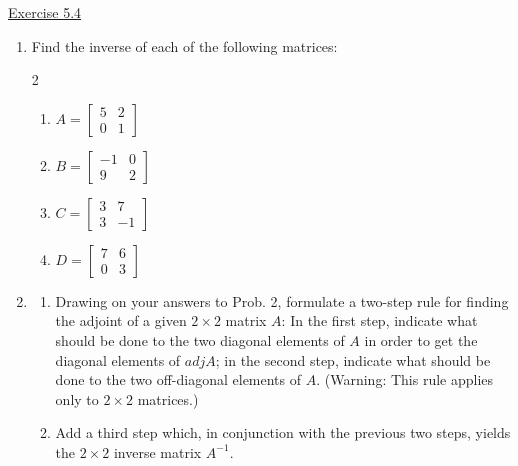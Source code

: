 
\underline{Exercise 5.4}

\begin{enumerate}

\item[2.] Find the inverse of each of the following matrices:
\begin{multicols}{2}
\begin{enumerate}
\item [(a)] $A=\left[\begin{array}{ll}5 & 2 \\ 0 & 1\end{array}\right]$
\item [(b)] $B=\left[\begin{array}{rr}-1 & 0 \\ 9 & 2\end{array}\right]$
\item [(c)] $C=\left[\begin{array}{rr}3 & 7 \\ 3 & -1\end{array}\right]$
\item [(d)] $D=\left[\begin{array}{ll}7 & 6 \\ 0 & 3\end{array}\right]$
\end{enumerate}
\end{multicols} 

\item[3.] 
\begin{enumerate}
\item Drawing on your answers to Prob. 2, formulate a two-step rule for finding the adjoint of a given $2 \times 2$ matrix $A$: In the first step, indicate what should be done to the two diagonal elements of $A$ in order to get the diagonal elements of $adjA$; in the second step, indicate what should be done to the two off-diagonal elements of $A$. (Warning: This rule applies only to $2 \times 2$ matrices.) 
\item Add a third step which, in conjunction with the previous two steps, yields the $2 \times 2$ inverse matrix $A^{-1}$.
\end{enumerate}


\end{enumerate}
